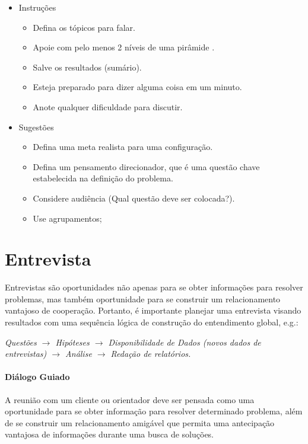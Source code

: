\begin{itemize}
	\item  Instruções
	\begin{itemize}
		\item    Defina os tópicos para falar.
		\item    Apoie com pelo menos 2 níveis de uma pirâmide .
		\item    Salve os resultados (sumário).
		\item    Esteja preparado para dizer alguma coisa em um minuto.
		\item    Anote qualquer dificuldade para discutir.
	\end{itemize}
	\item  Sugestões
	\begin{itemize}
		\item    Defina uma meta realista para uma configuração.
		\item    Defina um pensamento direcionador, que  é uma questão chave estabelecida na definição do problema.
		\item    Considere audiência (Qual questão deve ser colocada?).
		\item    Use agrupamentos;
	\end{itemize}
\end{itemize}

\section{Entrevista}

Entrevistas são oportunidades não apenas para se obter informações para resolver problemas, mas também oportunidade para se construir um relacionamento vantajoso de cooperação.
Portanto, é importante planejar uma entrevista  visando resultados com uma sequência lógica de construção do entendimento global, e.g.:


\emph{Questões $\to$ Hipóteses $\to$ Disponibilidade de Dados (novos dados de
	entrevistas) $\to$  Análise $\to$ Redação de relatórios.}

\paragraph{Diálogo Guiado}

A reunião com um cliente ou orientador deve ser pensada como uma oportunidade para se obter informação para resolver determinado problema, além de se construir um relacionamento amigável que permita uma antecipação vantajosa de informações durante uma busca de soluções.

